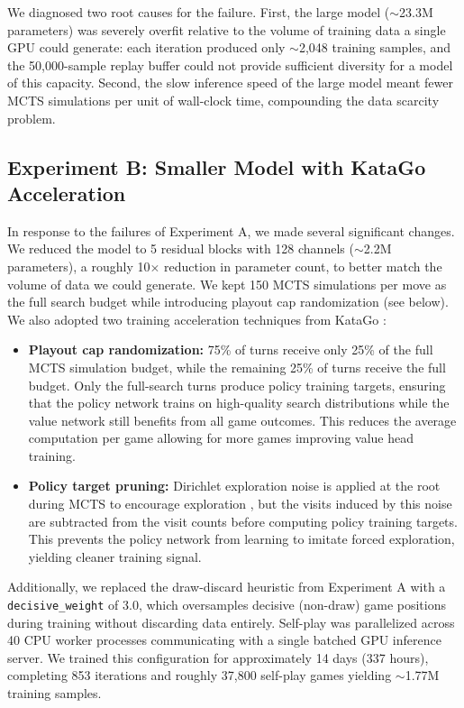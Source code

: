 \documentclass{article}
\begin{document}
We diagnosed two root causes for the failure. First, the large model ($\sim$23.3M parameters) was severely overfit relative to the volume of training data a single GPU could generate: each iteration produced only $\sim$2,048 training samples, and the 50,000-sample replay buffer could not provide sufficient diversity for a model of this capacity. Second, the slow inference speed of the large model meant fewer MCTS simulations per unit of wall-clock time, compounding the data scarcity problem.

\subsection{Experiment B: Smaller Model with KataGo Acceleration}

In response to the failures of Experiment A, we made several significant changes. We reduced the model to 5 residual blocks with 128 channels ($\sim$2.2M parameters), a roughly 10$\times$ reduction in parameter count, to better match the volume of data we could generate. We kept 150 MCTS simulations per move as the full search budget while introducing playout cap randomization (see below). We also adopted two training acceleration techniques from KataGo \cite{wu2019accelerating}:

\begin{itemize}
    \item \textbf{Playout cap randomization:} 75\% of turns receive only 25\% of the full MCTS simulation budget, while the remaining 25\% of turns receive the full budget. Only the full-search turns produce policy training targets, ensuring that the policy network trains on high-quality search distributions while the value network still benefits from all game outcomes. This reduces the average computation per game allowing for more games improving value head training.
    \item \textbf{Policy target pruning:} Dirichlet exploration noise is applied at the root during MCTS to encourage exploration \cite{silver2017mastering}, but the visits induced by this noise are subtracted from the visit counts before computing policy training targets\cite{wu2019accelerating}. This prevents the policy network from learning to imitate forced exploration, yielding cleaner training signal.
\end{itemize}

Additionally, we replaced the draw-discard heuristic from Experiment A with a \texttt{decisive\_weight} of 3.0, which oversamples decisive (non-draw) game positions during training without discarding data entirely. Self-play was parallelized across 40 CPU worker processes communicating with a single batched GPU inference server. We trained this configuration for approximately 14 days (337 hours), completing 853 iterations and roughly 37,800 self-play games yielding $\sim$1.77M training samples.
\end{document}
